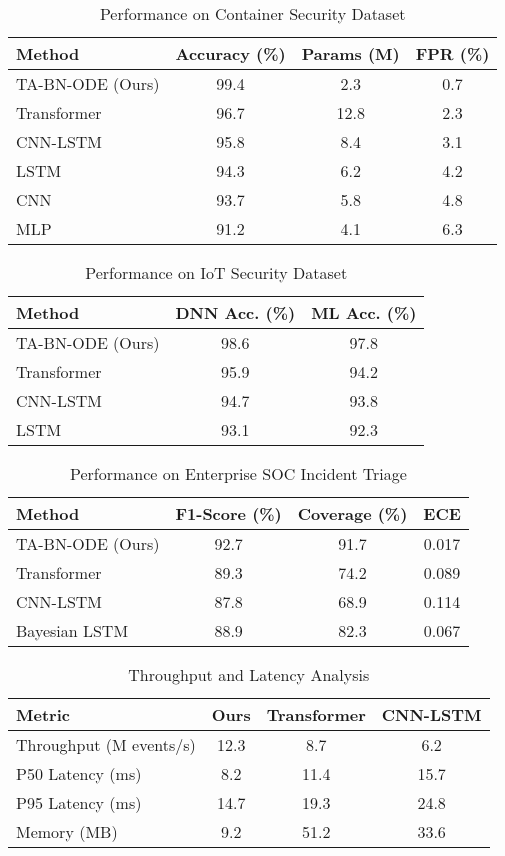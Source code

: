 \documentclass[10pt,journal,compsoc]{IEEEtran}
\begin{document}
\begin{table}[!t]
\centering
\caption{Performance on Container Security Dataset}
\label{tab:container_results}
\begin{tabular}{lccc}
\toprule
\textbf{Method} & \textbf{Accuracy (\%)} & \textbf{Params (M)} & \textbf{FPR (\%)} \\
\midrule
TA-BN-ODE (Ours) & 99.4 & 2.3 & 0.7 \\
Transformer & 96.7 & 12.8 & 2.3 \\
CNN-LSTM & 95.8 & 8.4 & 3.1 \\
LSTM & 94.3 & 6.2 & 4.2 \\
CNN & 93.7 & 5.8 & 4.8 \\
MLP & 91.2 & 4.1 & 6.3 \\
\bottomrule
\end{tabular}
\end{table}

\begin{table}[!t]
\centering
\caption{Performance on IoT Security Dataset}
\label{tab:iot_results}
\begin{tabular}{lcc}
\toprule
\textbf{Method} & \textbf{DNN Acc. (\%)} & \textbf{ML Acc. (\%)} \\
\midrule
TA-BN-ODE (Ours) & 98.6 & 97.8 \\
Transformer & 95.9 & 94.2 \\
CNN-LSTM & 94.7 & 93.8 \\
LSTM & 93.1 & 92.3 \\
\bottomrule
\end{tabular}
\end{table}

\begin{table}[!t]
\centering
\caption{Performance on Enterprise SOC Incident Triage}
\label{tab:guide_results}
\begin{tabular}{lccc}
\toprule
\textbf{Method} & \textbf{F1-Score (\%)} & \textbf{Coverage (\%)} & \textbf{ECE} \\
\midrule
TA-BN-ODE (Ours) & 92.7 & 91.7 & 0.017 \\
Transformer & 89.3 & 74.2 & 0.089 \\
CNN-LSTM & 87.8 & 68.9 & 0.114 \\
Bayesian LSTM & 88.9 & 82.3 & 0.067 \\
\bottomrule
\end{tabular}
\end{table}

\begin{table}[!t]
\centering
\caption{Throughput and Latency Analysis}
\label{tab:throughput}
\begin{tabular}{lccc}
\toprule
\textbf{Metric} & \textbf{Ours} & \textbf{Transformer} & \textbf{CNN-LSTM} \\
\midrule
Throughput (M events/s) & 12.3 & 8.7 & 6.2 \\
P50 Latency (ms) & 8.2 & 11.4 & 15.7 \\
P95 Latency (ms) & 14.7 & 19.3 & 24.8 \\
Memory (MB) & 9.2 & 51.2 & 33.6 \\
\bottomrule
\end{tabular}
\end{table}
\end{document}
